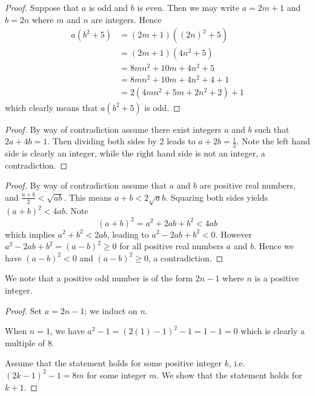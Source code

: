 \begin{questions}
    \begin{proof}
        Suppose that $a$ is odd and $b$ is even. Then we may write $a = 2m + 1$ and $b = 2n$ where $m$ and $n$ are integers. Hence
        \begin{align*}
            a(b^2+5) &= (2m+1)\left((2n)^2 + 5\right)\\
            &= (2m+1)(4n^2 + 5)\\
            &= 8mn^2 + 10m + 4n^2 + 5\\
            &= 8mn^2 + 10m + 4n^2 + 4 + 1\\
            &= 2(4mn^2 + 5m + 2n^2 + 2) + 1
        \end{align*}
    which clearly means that $a(b^2+5)$ is odd.
    \end{proof}

    \item \begin{proof}
        By way of contradiction assume there exist integers $a$ and $b$ such that $2a + 4b = 1$. Then dividing both sides by 2 leads to $a + 2b = \frac12$. Note the left hand side is clearly an integer, while the right hand side is not an integer, a contradiction.
    \end{proof}

    \item \begin{proof}
        By way of contradiction assume that $a$ and $b$ are positive real numbers, and $\frac{a+b}{2} < \sqrt{ab}$. This means $a+b<2\sqrt ab$. Squaring both sides yields $(a+b)^2 < 4ab$. Note
        \[
            (a+b)^2 = a^2 + 2ab + b^2 < 4ab
        \]
        which implies $a^2 + b^2 < 2ab$, leading to $a^2 - 2ab + b^2 < 0$. However $a^2 - 2ab + b^2 = (a-b)^2 \geq 0$ for all positive real numbers $a$ and $b$. Hence we have $(a-b)^2 < 0$ and $(a-b)^2 \geq 0$, a contradiction.
    \end{proof}

    \item We note that a positive odd number is of the form $2n - 1$ where $n$ is a positive integer.

    \begin{proof}
        Set $a = 2n - 1$; we induct on $n$.

        When $n = 1$, we have $a^2 - 1 = (2(1) - 1)^2 - 1 = 1 - 1 = 0$ which is clearly a multiple of 8.

        Assume that the statement holds for some positive integer $k$, i.e. $(2k-1)^2 - 1 = 8m$ for some integer $m$. We show that the statement holds for $k + 1$.


\end{proof}
\end{questions}
